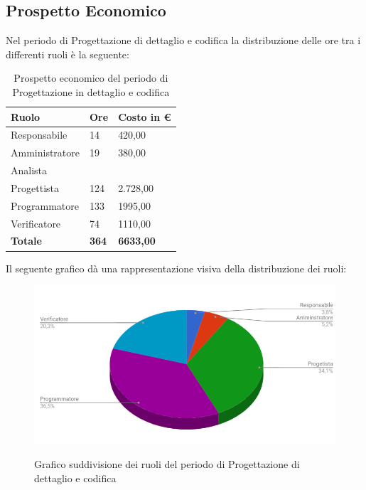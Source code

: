 \documentclass[PianoDiProgetto.tex]{subfiles}
\begin{document}
\subsection{Prospetto Economico}
Nel periodo di Progettazione di dettaglio e codifica la distribuzione delle ore tra i differenti ruoli è la seguente:\begin{center}
\begin{table}[htbp]
	\centering
	\renewcommand\arraystretch{1.5}
	\begin{tabularx}{\textwidth}{p{5cm}|p{4cm}|p{4cm}}
		\hline
		\textbf{Ruolo} & \textbf{Ore} & \textbf{Costo in \euro} \\
		\hline
		Responsabile & 14 & 420,00 \\
		\hline
		Amministratore & 19 & 380,00 \\
		\hline
		Analista & \ & \ \\
		\hline
		Progettista & 124 & 2.728,00 \\
		\hline
		Programmatore & 133 & 1995,00 \\
		\hline
		Verificatore & 74 & 1110,00 \\
		\hline
		\textbf{Totale} & \textbf{364} & \textbf{6633,00}\\
		\hline
	\end{tabularx}
	\caption{Prospetto economico del periodo di Progettazione in dettaglio e codifica}
	\label{my-label}
\end{table} 
\end{center}
Il seguente grafico dà una rappresentazione visiva della distribuzione dei ruoli:
\begin{figure}[h]
	\centering
	\includegraphics[width=12.5cm]{images/prospettoEconomico/progCod.png}
	\label{fig:foo}
	\caption{Grafico suddivisione dei ruoli del periodo di Progettazione di dettaglio e codifica}
\end{figure} 
\clearpage
\end{document}

